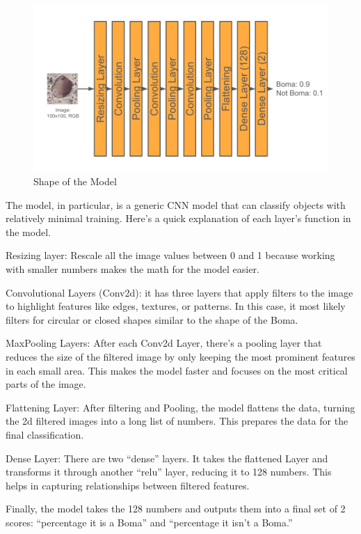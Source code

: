 \documentclass[10pt]{article}
\begin{document}
\begin{figure} [H] %
    \centering
    \includegraphics[width=1\linewidth]{images/Model Shape.png}
    \caption{Shape of the Model}
    \label{fig:model_shape}
\end{figure}

The model, in particular, is a generic CNN model that can classify objects with relatively minimal training. Here's a quick explanation of each layer's function in the model.

Resizing layer: Rescale all the image values between 0 and 1 because working with smaller numbers makes the math for the model easier.

Convolutional Layers (Conv2d): it has three layers that apply filters to the image to highlight features like edges, textures, or patterns. In this case, it most likely filters for circular or closed shapes similar to the shape of the Boma.

MaxPooling Layers: After each Conv2d Layer, there's a pooling layer that reduces the size of the filtered image by only keeping the most prominent features in each small area. This makes the model faster and focuses on the most critical parts of the image.

Flattening Layer: After filtering and Pooling, the model flattens the data, turning the 2d filtered images into a long list of numbers. This prepares the data for the final classification.

Dense Layer: There are two “dense” layers. It takes the flattened Layer and transforms it through another “relu” layer, reducing it to 128 numbers. This helps in capturing relationships between filtered features.

Finally, the model takes the 128 numbers and outputs them into a final set of 2 scores: “percentage it is a Boma” and “percentage it isn't a Boma.”
\end{document}
